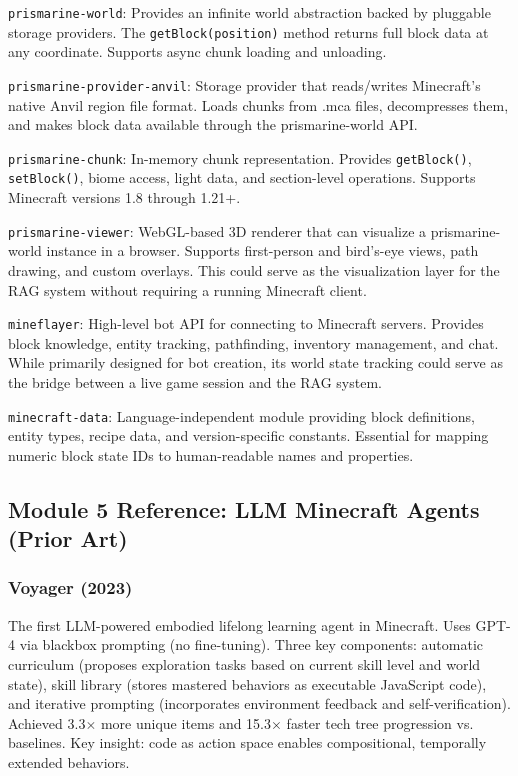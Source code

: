 \documentclass[11pt,letterpaper]{article}
\begin{document}
\texttt{prismarine-world}: Provides an infinite world abstraction backed by pluggable storage providers. The \texttt{getBlock(position)} method returns full block data at any coordinate. Supports async chunk loading and unloading.

\texttt{prismarine-provider-anvil}: Storage provider that reads/writes Minecraft's native Anvil region file format. Loads chunks from .mca files, decompresses them, and makes block data available through the prismarine-world API.

\texttt{prismarine-chunk}: In-memory chunk representation. Provides \texttt{getBlock()}, \texttt{setBlock()}, biome access, light data, and section-level operations. Supports Minecraft versions 1.8 through 1.21+.

\texttt{prismarine-viewer}: WebGL-based 3D renderer that can visualize a prismarine-world instance in a browser. Supports first-person and bird's-eye views, path drawing, and custom overlays. This could serve as the visualization layer for the RAG system without requiring a running Minecraft client.

\texttt{mineflayer}: High-level bot API for connecting to Minecraft servers. Provides block knowledge, entity tracking, pathfinding, inventory management, and chat. While primarily designed for bot creation, its world state tracking could serve as the bridge between a live game session and the RAG system.

\texttt{minecraft-data}: Language-independent module providing block definitions, entity types, recipe data, and version-specific constants. Essential for mapping numeric block state IDs to human-readable names and properties.

\subsection{Module 5 Reference: LLM Minecraft Agents (Prior Art)}

\subsubsection{Voyager (2023)}
The first LLM-powered embodied lifelong learning agent in Minecraft. Uses GPT-4 via blackbox prompting (no fine-tuning). Three key components: automatic curriculum (proposes exploration tasks based on current skill level and world state), skill library (stores mastered behaviors as executable JavaScript code), and iterative prompting (incorporates environment feedback and self-verification). Achieved 3.3$\times$ more unique items and 15.3$\times$ faster tech tree progression vs. baselines. Key insight: code as action space enables compositional, temporally extended behaviors.
\end{document}

